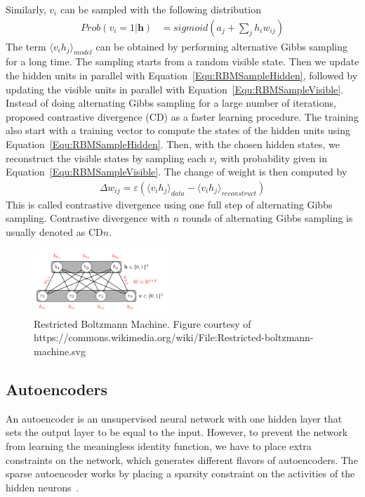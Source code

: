 Similarly, $v_i$ can be sampled with the following distribution
\begin{align}
    Prob(v_i = 1 | \mathbf{h}) &= sigmoid(a_j + \sum_j{h_i w_{ij}})
    \label{Equ:RBMSampleVisible}
\end{align}
The term $\langle v_i h_j \rangle_{model}$ can be obtained by performing alternative Gibbs
sampling for a long time.
The sampling starts from a random visible state.
Then we update the hidden units in parallel with Equation~\ref{Equ:RBMSampleHidden},
followed by updating the visible units in parallel with Equation~\ref{Equ:RBMSampleVisible}.
Instead of doing alternating Gibbs sampling for a large number of iterations,
\cite{TrainCD} proposed contrastive divergence (CD) as a faster learning procedure.
The training also start with a training vector to compute the states of the hidden units
using Equation~\ref{Equ:RBMSampleHidden}.
Then, with the chosen hidden states, we reconstruct the visible states by sampling each $v_i$
with probability given in Equation~\ref{Equ:RBMSampleVisible}.
The change of weight is then computed by
\begin{align}
    \Delta w_{ij} = \varepsilon (\langle v_i h_j \rangle_{data} -
    \langle v_i h_j \rangle_{reconstruct})
    \label{Equ:RBMCD1}
\end{align}
This is called contrastive divergence using one full step of alternating Gibbs sampling.
Contrastive divergence with $n$ rounds of alternating Gibbs sampling
is usually denoted as CD$n$.

\begin{figure}[h]
    \centering
    \includegraphics[width=0.45\textwidth]{figures/rbm.png}
    \caption{Restricted Boltzmann Machine.
        Figure courtesy of https://commons.wikimedia.org/wiki/File:Restricted-boltzmann-machine.svg}
    \label{Fig:RBMArchitecture}
\end{figure}

\fi

\subsection{Autoencoders}
An autoencoder is an unsupervised neural network with one hidden layer that sets the output layer to be equal to the input.
However, to prevent the network from learning the meaningless identity function, we have to place extra constraints on the network,
which generates different flavors of autoencoders.
The sparse autoencoder works by placing a sparsity constraint on the activities of the hidden neurons~\cite{SparseAE}.

